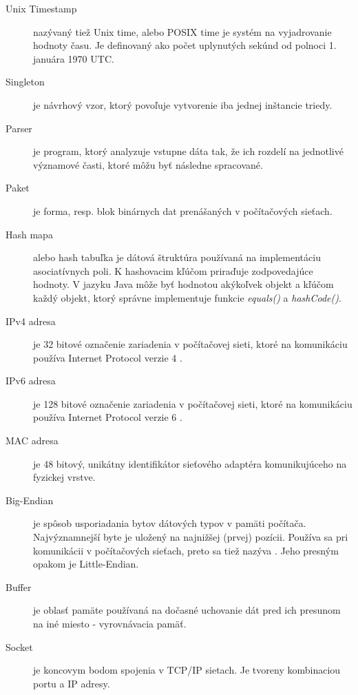\documentclass[]{tukediphc}
\begin{document}
\begin{description}
	\item[Unix Timestamp] nazývaný tiež Unix time, alebo POSIX time je systém na vyjadrovanie 
	hodnoty času. Je definovaný ako počet uplynutých sekúnd od polnoci 1. januára 1970 UTC.
	
	\item[Singleton] je návrhový vzor, ktorý povoľuje vytvorenie iba jednej inštancie triedy. 
	
	\item[Parser] je program, ktorý analyzuje vstupne dáta tak, že ich rozdelí na jednotlivé 
	významové časti, ktoré môžu byť následne spracované. \citep{veri}
	
	\item[Paket] je forma, resp. blok binárnych dat prenášaných v počítačových sieťach.
	
	\item[Hash mapa] alebo hash tabuľka je dátová štruktúra používaná na implementáciu asociatívnych 
	poli. K hashovacim kľúčom priraďuje zodpovedajúce hodnoty. V jazyku Java môže byť hodnotou 
	akýkoľvek objekt a kľúčom každý objekt, ktorý správne implementuje funkcie \emph{equals()} a 
	\emph{hashCode()}.
	
	\item[IPv4 adresa] je 32 bitové označenie zariadenia v počítačovej sieti, ktoré na komunikáciu 
	používa Internet Protocol verzie 4 \citep{rfc791}.
	
	\item[IPv6 adresa] je 128 bitové označenie zariadenia v počítačovej sieti, ktoré na komunikáciu 
	používa Internet Protocol verzie 6 \citep{rfc2460}.
	
	\item[MAC adresa] je 48 bitový, unikátny identifikátor sieťového adaptéra komunikujúceho na 
	fyzickej vrstve. 
	
	\item[Big-Endian] je spôsob usporiadania bytov dátových typov v pamäti počítača. Najvýznamnejší 
	byte je uložený na najnižšej (prvej) pozícii. Používa sa pri komunikácii v počítačových sieťach,
	preto sa tiež nazýva . Jeho presným opakom je Little-Endian.
	
	\item[Buffer] je oblasť pamäte používaná na dočasné uchovanie dát pred ich presunom na iné 
	miesto - vyrovnávacia pamäť.
	
	\item[Socket] je koncovym bodom spojenia v TCP/IP sietach. Je tvoreny kombinaciou portu a IP 
	adresy. \citep{linktionary} 
	
\end{description}
\end{document}
